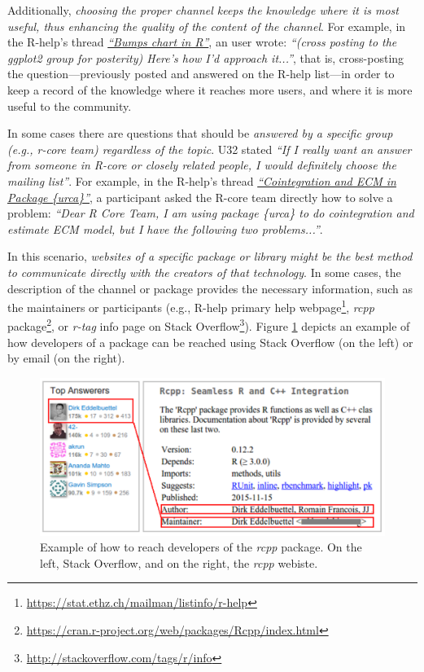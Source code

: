 \documentclass{sig-alternate-05-2015}
\begin{document}
		Additionally, \emph{choosing the proper channel keeps the knowledge where it is most useful, thus enhancing the quality of the content of the channel}.
		For example, in the R-help's thread \textit{\href{http://goo.gl/EJHWrs}{``Bumps chart in R''}}, an user wrote: \textit{``(cross posting to the ggplot2 group for posterity) Here's how I'd approach it...''}, that is, cross-posting the question---previously posted and answered on the R-help list---in order to keep a record of the knowledge where it reaches more users, and where it is more useful to the community.

		In some cases there are questions that should be \emph{answered by a \textit{specific group} (e.g., r-core team) regardless of the topic}.
		U32 stated \textit{``If I really want an answer from someone in R-core or closely related people, I would definitely choose the mailing list''}.
		For example, in the R-help's thread \textit{\href{http://goo.gl/7olLv7}{``Cointegration and ECM in Package \{urca\}''}}, a participant asked the R-core team directly how to solve a problem: \textit{``Dear R Core Team, I am using package \{urca\} to do cointegration and estimate ECM model, but I have the following two problems...''}.

		In this scenario, \emph{websites of a specific package or library might be the best method to communicate directly with the creators of that technology}.
		In some cases, the description of the channel or package provides the necessary information, such as the maintainers or participants (e.g., R-help primary help webpage\footnote{\url{https://stat.ethz.ch/mailman/listinfo/r-help}}, \emph{rcpp} package\footnote{\url{https://cran.r-project.org/web/packages/Rcpp/index.html}}, or \textit{r-tag} info page on Stack Overflow\footnote{\url{http://stackoverflow.com/tags/r/info}}).
		Figure \ref{fig:CCchannel} depicts an example of how developers of a package can be reached using Stack Overflow (on the left) or by email (on the right). 

		\begin{figure} [!htb]
			\centering
			\includegraphics[width=\columnwidth]{Figures/CCchannel}
			\caption{Example of how to reach developers of the \emph{rcpp} package. On the left, Stack Overflow, and on the right, the \emph{rcpp} webiste.}
			\label{fig:CCchannel}
		\end{figure}
\end{document}
